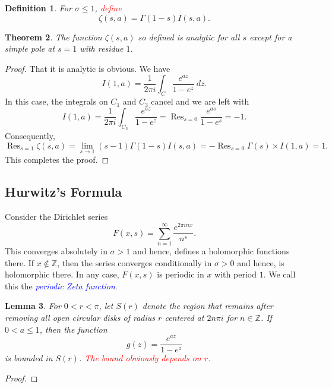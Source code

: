 \documentclass[12pt]{article}
\theoremstyle{thmstyle}
\newtheorem{theorem}{Theorem}[section]
\newtheorem{lemma}[theorem]{Lemma}
\theoremstyle{defstyle}
\newtheorem{definition}[theorem]{Definition}
\newcommand{\Z}{\mathbb{Z}}
\newcommand{\define}[1]{\textcolor{blue}{\textit{#1}}}
\newcommand{\caution}[1]{\textcolor{red}{\textit{#1}}}
\renewcommand{\le}{\leqslant}
\newcommand{\Res}{\operatorname{Res}}
\begin{document}
\begin{definition}
    For $\sigma\le 1$, \caution{define} 
    \begin{equation*}
        \zeta(s, a) = \Gamma(1 - s)I(s, a).
    \end{equation*}
\end{definition}

\begin{theorem}
    The function $\zeta(s, a)$ so defined is analytic for all $s$ except for a simple pole at $s = 1$ with residue $1$. 
\end{theorem}
\begin{proof}
    That it is analytic is obvious. We have 
    \begin{equation*}
        I(1, a) = \frac{1}{2\pi i}\int_C\frac{e^{az}}{1 - e^z}~dz.
    \end{equation*}
    In this case, the integrals on $C_1$ and $C_3$ cancel and we are left with 
    \begin{equation*}
        I(1, a) = \frac{1}{2\pi i}\int_{C_2}\frac{e^{az}}{1 - e^z} = \operatorname{Res}_{s = 0}\frac{e^{as}}{1 - e^s} = -1.
    \end{equation*}
    Consequently, 
    \begin{equation}
        \Res_{s = 1}\zeta(s, a) = \lim_{s\to 1}(s - 1)\Gamma(1 - s)I(s, a) = -\Res_{s = 0}\Gamma(s)\times I(1, a) = 1.
    \end{equation}
    This completes the proof.
\end{proof}

\subsection{Hurwitz's Formula}
Consider the Dirichlet series
\begin{equation*}
    F(x, s) = \sum_{n = 1}^\infty \frac{e^{2\pi inx}}{n^s}.
\end{equation*}
This converges absolutely in $\sigma > 1$ and hence, defines a holomorphic functions there. If $x\notin\Z$, then the series converges conditionally in $\sigma > 0$ and hence, is holomorphic there. In any case, $F(x,s)$ is periodic in $x$ with period $1$. We call this the \define{periodic Zeta function}.


\begin{lemma}
    For $0 < r < \pi$, let $S(r)$ denote the region that remains after removing all open circular disks of radius $r$ centered at $2n\pi i$ for $n\in\Z$. If $0 < a\le 1$, then the function 
    \begin{equation*}
        g(z) = \frac{e^{az}}{1 - e^z}
    \end{equation*}
    is bounded in $S(r)$. \caution{The bound obviously depends on $r$.}
\end{lemma}
\begin{proof}
\end{proof}
\end{document}
